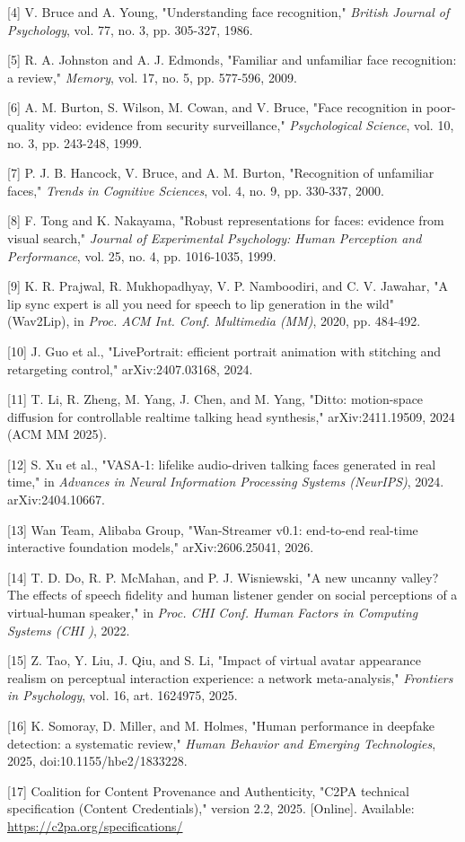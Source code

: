 \documentclass[
]{article}
\begin{document}
{[}4{]} V. Bruce and A. Young, "Understanding face recognition,"
\emph{British Journal of Psychology}, vol. 77, no. 3, pp. 305-327, 1986.

{[}5{]} R. A. Johnston and A. J. Edmonds, "Familiar and unfamiliar face
recognition: a review," \emph{Memory}, vol. 17, no. 5, pp. 577-596,
2009.

{[}6{]} A. M. Burton, S. Wilson, M. Cowan, and V. Bruce, "Face
recognition in poor-quality video: evidence from security surveillance,"
\emph{Psychological Science}, vol. 10, no. 3, pp. 243-248, 1999.

{[}7{]} P. J. B. Hancock, V. Bruce, and A. M. Burton, "Recognition of
unfamiliar faces," \emph{Trends in Cognitive Sciences}, vol. 4, no. 9,
pp. 330-337, 2000.

{[}8{]} F. Tong and K. Nakayama, "Robust representations for faces:
evidence from visual search," \emph{Journal of Experimental Psychology:
Human Perception and Performance}, vol. 25, no. 4, pp. 1016-1035, 1999.

{[}9{]} K. R. Prajwal, R. Mukhopadhyay, V. P. Namboodiri, and C. V.
Jawahar, "A lip sync expert is all you need for speech to lip generation
in the wild" (Wav2Lip), in \emph{Proc. ACM Int. Conf. Multimedia (MM)},
2020, pp. 484-492.

{[}10{]} J. Guo et al., "LivePortrait: efficient portrait animation with
stitching and retargeting control," arXiv:2407.03168, 2024.

{[}11{]} T. Li, R. Zheng, M. Yang, J. Chen, and M. Yang, "Ditto:
motion-space diffusion for controllable realtime talking head
synthesis," arXiv:2411.19509, 2024 (ACM MM 2025).

{[}12{]} S. Xu et al., "VASA-1: lifelike audio-driven talking faces
generated in real time," in \emph{Advances in Neural Information
Processing Systems (NeurIPS)}, 2024. arXiv:2404.10667.

{[}13{]} Wan Team, Alibaba Group, "Wan-Streamer v0.1: end-to-end
real-time interactive foundation models," arXiv:2606.25041, 2026.

{[}14{]} T. D. Do, R. P. McMahan, and P. J. Wisniewski, "A new uncanny
valley? The effects of speech fidelity and human listener gender on
social perceptions of a virtual-human speaker," in \emph{Proc. CHI Conf.
Human Factors in Computing Systems (CHI )}, 2022.

{[}15{]} Z. Tao, Y. Liu, J. Qiu, and S. Li, "Impact of virtual avatar
appearance realism on perceptual interaction experience: a network
meta-analysis," \emph{Frontiers in Psychology}, vol. 16, art. 1624975,
2025.

{[}16{]} K. Somoray, D. Miller, and M. Holmes, "Human performance in
deepfake detection: a systematic review," \emph{Human Behavior and
Emerging Technologies}, 2025, doi:10.1155/hbe2/1833228.

{[}17{]} Coalition for Content Provenance and Authenticity, "C2PA
technical specification (Content Credentials)," version 2.2, 2025.
{[}Online{]}. Available: \url{https://c2pa.org/specifications/}
\end{document}
